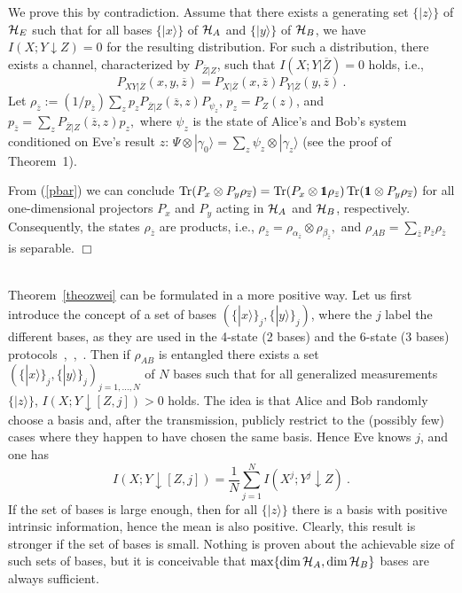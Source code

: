 \documentclass{article}
\newcommand{\Tr}{{\rm Tr}}
\newcommand{\HA}{{\cal H}_{{A}}}
\newcommand{\HB}{{\cal H}_{{B}}}
\newcommand{\HE}{{\cal H}_{{E}}}
\newcommand{\noi}{\noindent}
\newcommand{\peon}{\hspace*{\fill} $\Box$\\}
\newcommand{\z}{{\bf Z}}
\newcommand{\OZ}{\overline{Z}}
\def\down{\downarrow}
\def\opone{\leavevmode\hbox{\small1\kern-3.8pt\normalsize1}}
\def\z{{\bar z}}
\begin{document}
\noi
\proof
We prove this by contradiction.
Assume 
that there exists a generating set $\{|z\rangle\}$ of $\HE$ such that for 
all bases $\{|x\rangle\}$ of $\HA$ and $\{|y\rangle\}$ of $\HB$,
we have $I(X;Y\down Z)=0$  for the resulting distribution. 
For such a distribution,  there exists a channel, characterized by
$P_{\OZ|Z}$,
such that $I(X;Y|\OZ)=0$ holds, i.e., 
\begin{equation}
P_{XY|\OZ}(x,y,\overline{z})=P_{X|\OZ}(x,\overline{z})P_{Y|\OZ}(y,\overline{z})\ .
\label{pbar}
\end{equation}
Let 
$
\rho_{\overline{z}}
:=(1/p_{\overline{z}})\sum_z p_z P_{\OZ|Z}(\overline{z},z)P_{\psi_z}
$,
$p_z=P_Z(z)$,
and
$
p_{\overline{z}}=\sum_z P_{\OZ|Z}(\overline{z},z)p_z,
$
where $\psi_z$ is the state of Alice's and Bob's system conditioned on Eve's
result $z$:
$\Psi\otimes|\gamma_0\rangle=\sum_z\psi_z\otimes|\gamma_z\rangle$
(see the proof of Theorem~1).

 From (\ref{pbar}) we can conclude
$
\Tr(P_x\otimes P_y\rho_{\overline{z}})=\Tr(P_x\otimes \opone\rho_{\bar
z})\, \Tr(\opone\otimes P_y\rho_{\overline{z}})
$
for all one-dimensional
 projectors $P_x$ and $P_y$ acting in $\HA$ and $\HB$,
respectively.
Consequently, the states $\rho_{\overline{z}}$ are products, i.e., 
$
\rho_{\overline{z}}=\rho_{\alpha_{\overline{z}}}\otimes\rho_{\beta_{\overline{z}}},
$
and $\rho_{AB}=\sum_\z p_\z \rho_\z$ is separable.
\peon \ 


Theorem~\ref{theozwei} can be formulated in a more 
positive way. Let us first 
introduce the concept of a set of bases 
$(\{|x\rangle\}_j,\{|y\rangle\}_j)$,
where the $j$
   label the different bases, as they are used in the 4-state (2 bases) and
   the 6-state (3 bases) protocols~\cite{BB84},\, \cite{Dagmar6state},\, \cite{bg}. 
Then if $\rho_{AB}$ is entangled there exists a set
$(\{|x\rangle\}_j,\{|y\rangle\}_j)_{j=1,\ldots,N}$
 of $N$
bases such that for all generalized measurements $\{|z\rangle\}$,
$
I(X;Y\down [Z,j])>0
$
holds.
The idea is that Alice and Bob randomly choose a basis and, after the
transmission, publicly restrict to the (possibly few) cases where they
happen to have
chosen the same basis. Hence Eve knows $j$, and one has
\[
I(X;Y\down [Z,j])=\frac{1}{N}\sum_{j=1}^N I(X^j;Y^j\down Z)\ .
\]
If the set of bases is large enough, then for all $\{|z\rangle\}$
 there is a basis with
positive intrinsic information, 
hence the mean is also positive. 
Clearly, this result is 
stronger if the set of bases is small. 
Nothing is proven about 
the achievable size of such sets of bases, but it is conceivable that
$\max\{\dim\HA,\dim\HB\}$
 bases
are always sufficient.
\end{document}
